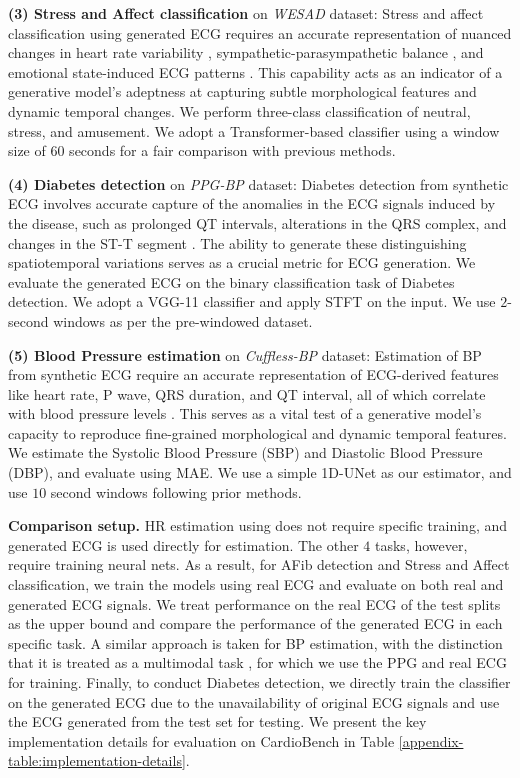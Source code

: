 \documentclass[letterpaper]{article} %
\begin{document}
    \textbf{(3) Stress and Affect classification} on \textit{WESAD} \cite{schmidt2018introducing} dataset: Stress and affect classification using generated ECG requires an accurate representation of nuanced changes in heart rate variability \cite{kim2018stress}, sympathetic-parasympathetic balance \cite{tewari2006sympathetic}, and emotional state-induced ECG patterns \cite{sarkar2020self}. This capability acts as an indicator of a generative model's adeptness at capturing subtle morphological features and dynamic temporal changes. We perform three-class classification of neutral, stress, and amusement. We adopt a Transformer-based classifier \cite{behinaein2021transformer} using a window size of $60$ seconds for a fair comparison with previous methods. 
    
    \textbf{(4) Diabetes detection} on \textit{PPG-BP} \cite{liang2018new} dataset: Diabetes detection from synthetic ECG involves accurate capture of the 
    anomalies in the ECG signals induced by the disease, such as prolonged QT intervals, alterations in the QRS complex, and changes in the ST-T segment \cite{veglio2004qt}. The ability to generate these distinguishing spatiotemporal variations serves as a crucial metric for ECG generation. We evaluate the generated ECG on the binary classification task of Diabetes detection.
    We adopt a VGG-11 classifier \cite{reiss2019deep} and apply STFT on the input. We use $2$-second windows as per the pre-windowed dataset. 
    
    \textbf{(5) Blood Pressure estimation} on \textit{Cuffless-BP} \cite{kachuee2015cuff} dataset: Estimation of BP from synthetic ECG require an accurate representation of ECG-derived features like heart rate, P wave, QRS duration, and QT interval, all of which correlate with blood pressure levels \cite{peng2006heart, bird2020assessment}. 
    This serves as a vital test of a generative model's capacity to reproduce fine-grained morphological and dynamic temporal features.
    We estimate the Systolic Blood Pressure (SBP) and Diastolic Blood Pressure (DBP), and evaluate using MAE.
    We use a simple 1D-UNet \cite{long2023bpnet} as our estimator, and use $10$ second windows following prior methods. 


\noindent \textbf{Comparison setup.}
HR estimation using \cite{hamilton2002open}
does not require specific training, and generated ECG is used directly for estimation. The other $4$ tasks, however, require training neural nets. As a result, for AFib detection and Stress and Affect classification, we train the models using real ECG and evaluate on both real and generated ECG signals. We treat performance on the real ECG of the test splits as the upper bound and compare the performance of the generated ECG in each specific task. A similar approach is taken for BP estimation, with the distinction that it is treated as a multimodal task \cite{elgendi2019use}, for which we use the PPG and real ECG for training. Finally, to conduct Diabetes detection, we directly train the classifier on the generated ECG due to the unavailability of original ECG signals and use the ECG generated from the test set for testing. We present the key implementation details for evaluation on CardioBench in Table \ref{appendix-table:implementation-details}.
\end{document}
